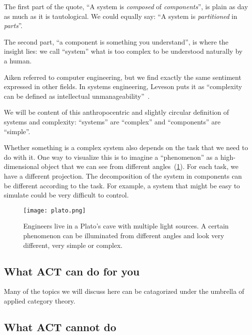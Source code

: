 The first part of the quote, ``A system is \emph{composed} of \emph{components}'', is plain as day as much as it is tautological.
We could equally say: ``A system is \emph{partitioned} in \emph{parts}''.

The second part, ``a component is something you understand'', is where the insight lies: we call ``system'' what is too complex to be understood naturally by a human.

Aiken referred to computer engineering, but we find exactly the same sentiment expressed in other fields.
In systems engineering, Leveson puts it as ``complexity can be defined as intellectual unmanageability''~\cite{leveson12engineering}.

We will be content of this anthropocentric and slightly circular definition of systems and complexity: ``systems'' are ``complex'' and ``components'' are ``simple''.

Whether something is a complex system also depends on the task that we need to do with it.
One way to visualize this is to imagine a ``phenomenon'' as a high-dimensional object that we can see from different angles~(\cref{fig:aspects}).
For each task, we have a different projection.
The decomposition of the system in components can be different according to the task.
For example, a system that might be easy to simulate could be very difficult to control.

\begin{figure}[h]
    \centering
    \texttt{[image: plato.png]}
    \caption{
        Engineers live in a Plato's cave with multiple light sources.
        A certain phenomenon can be illuminated from different angles and look very different, very simple or complex.
    }
    \label{fig:aspects}
\end{figure}


\subsection{What ACT can do for you}

Many of the topics we will discuss here can be catagorized under the umbrella of applied category theory.


\subsection{What ACT cannot do}


